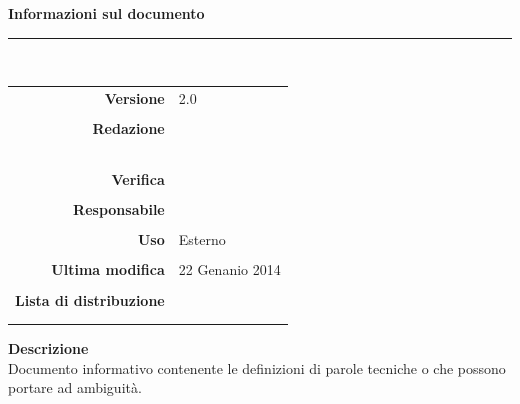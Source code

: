 \begin{titlepage}
\begin{center}
	\vspace{1cm}
	\textbf{Informazioni sul documento}\\
    \rule{10cm}{.4pt} \\
	\begin{table}[h]
	\begin{center}
	\begin{tabular}{r | l}
		\textbf{Versione} & 2.0 \\ \\
		\textbf{Redazione} & \ReAn \\
			& \CaMa \\
			& \MaMo \\
			& \CoMa \\
			& \GoIs \\ \\
		\textbf{Verifica} &\VeFe \\ \\
		\textbf{Responsabile} & \VeFe \\ \\
		\textbf{Uso} & Esterno \\ \\
		\textbf{Ultima modifica} & 22 Genanio 2014 \\ \\
		\textbf{Lista di distribuzione} & \Vardanega \\ 
		    & \Cardin \\
		    & \Zucchetti
	\end{tabular}
	\end{center}
	\end{table}
			\textbf{Descrizione} \\
			Documento informativo contenente le definizioni di parole tecniche o che possono portare ad ambiguità. 
	\end{center}
\end{titlepage}